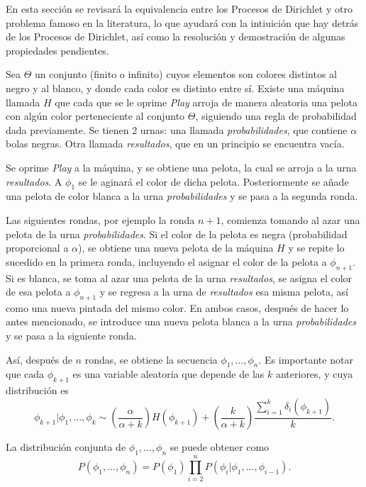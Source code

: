 En esta secci\'on se revisar\'a la equivalencia entre los Procesos de Dirichlet y otro problema famoso en la literatura, lo que ayudar\'a con la intiuici\'on que hay detr\'as de los Procesos de Dirichlet, as\'i como la resoluci\'on y demostraci\'on de algunas propiedades pendientes.

Sea $\Theta$ un conjunto (finito o infinito) cuyos elementos son colores distintos al negro y al blanco, y donde cada color es distinto entre s\'i. Existe una m\'aquina llamada $H$ que cada que se le oprime \textit{Play} arroja de manera aleatoria una pelota con algún color perteneciente al conjunto $\Theta$, siguiendo una regla de probabilidad dada previamente. Se tienen 2 urnas: una llamada \textit{probabilidades}, que contiene $\alpha$ bolas negras. Otra llamada \textit{resultados}, que en un principio se encuentra vac\'ia. 

Se oprime \textit{Play} a la m\'aquina, y se obtiene una pelota, la cual se arroja a la urna \textit{resultados}. A $\phi_1$ se le aginar\'a el color de dicha pelota. Posteriormente se añade una pelota de color blanca a la urna \textit{probabilidades} y se pasa a la segunda ronda.  

Las siguientes rondas, por ejemplo la ronda $n+1$, comienza tomando al azar una pelota de la urna \textit{probabilidades}. Si el color de la pelota es negra (probabilidad proporcional a $\alpha$), se obtiene una nueva pelota de la m\'aquina $H$ y se repite lo sucedido en la primera ronda, incluyendo el asignar el color de la pelota a $\phi_{n+1}$. Si es blanca, se toma al azar una pelota de la urna \textit{resultados}, se asigna el color de esa pelota a $\phi_{n+1}$ y se regresa a la urna de \textit{resultados} esa misma pelota, as\'i como una nueva pintada del mismo color. En ambos casos, después de hacer lo antes mencionado, se introduce una nueva pelota blanca a la urna \textit{probabilidades} y se pasa a la siguiente ronda. 

Así, despu\'es de $n$ rondas, se obtiene la secuencia $\phi_1,...,\phi_n$. Es importante notar que cada $\phi_{k+1}$ es una variable aleatoria que depende de las $k$ anteriores, y cuya distribuci\'on es
\begin{equation*}
    \phi_{k+1}|\phi_1,...,\phi_k \sim 
    \left(\frac{\alpha}{\alpha + k}\right)H(\phi_{k+1}) + 
    \left(\frac{k}{\alpha + k}\right)\frac{\sum_{i=1}^k \delta_i(\phi_{k+1})}{k}.
\end{equation*}

La distribuci\'on conjunta de $\phi_1,...,\phi_n$ se puede obtener como
\begin{equation*}
    P(\phi_1,...,\phi_n) = 
    P(\phi_1)
    \prod_{i=2}^n
    P(\phi_i|\phi_1,...,\phi_{i-1}).
\end{equation*}

